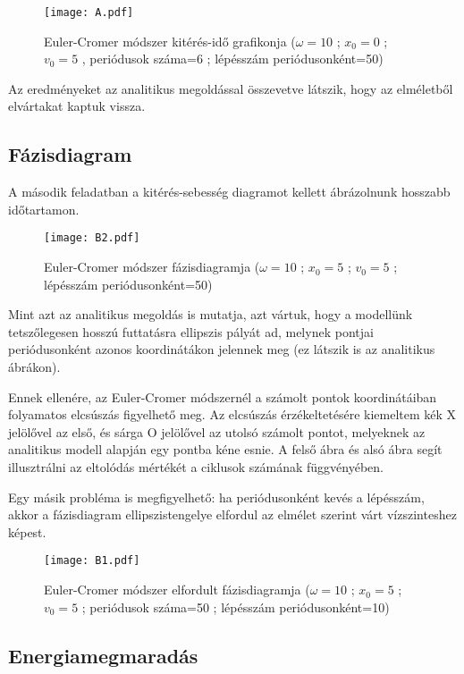\documentclass[a4paper,12pt]{article}
\begin{document}
\begin{figure}[ht!]
\centering
\texttt{[image: A.pdf]}
\caption{Euler-Cromer módszer kitérés-idő grafikonja ($\omega=10$ ; $x_0=0$ ; $v_0=5$ , periódusok száma=6 ; lépésszám periódusonként=50)}
\end{figure}

Az eredményeket az analitikus megoldással összevetve látszik, hogy az elméletből elvártakat kaptuk vissza.

\newpage

\subsection{Fázisdiagram}

A második feladatban a kitérés-sebesség diagramot kellett ábrázolnunk hosszabb időtartamon.

\begin{figure}[ht!]
\centering
\texttt{[image: B2.pdf]}
\caption{Euler-Cromer módszer fázisdiagramja ($\omega=10$ ; $x_0=5$ ; $v_0=5$ ; lépésszám periódusonként=50)}
\end{figure}

Mint azt az analitikus megoldás is mutatja, azt vártuk, hogy a modellünk tetszőlegesen hosszú futtatásra ellipszis pályát ad, melynek pontjai periódusonként azonos koordinátákon jelennek meg (ez látszik is az analitikus ábrákon).

Ennek ellenére, az Euler-Cromer módszernél a számolt pontok koordinátáiban folyamatos elcsúszás figyelhető meg. Az elcsúszás érzékeltetésére kiemeltem kék X jelölővel az első, és sárga O jelölővel az utolsó számolt pontot, melyeknek az analitikus modell alapján egy pontba kéne esnie. A felső ábra és alsó ábra segít illusztrálni az eltolódás mértékét a ciklusok számának függvényében.

\bigskip

Egy másik probléma is megfigyelhető: ha periódusonként kevés a lépésszám, akkor a fázisdiagram ellipszistengelye elfordul az elmélet szerint várt vízszinteshez képest.

\begin{figure}[ht!]
\centering
\texttt{[image: B1.pdf]}
\caption{Euler-Cromer módszer elfordult fázisdiagramja ($\omega=10$ ; $x_0=5$ ; $v_0=5$ ; periódusok száma=50 ; lépésszám periódusonként=10)}
\end{figure}

\subsection{Energiamegmaradás}
\end{document}
